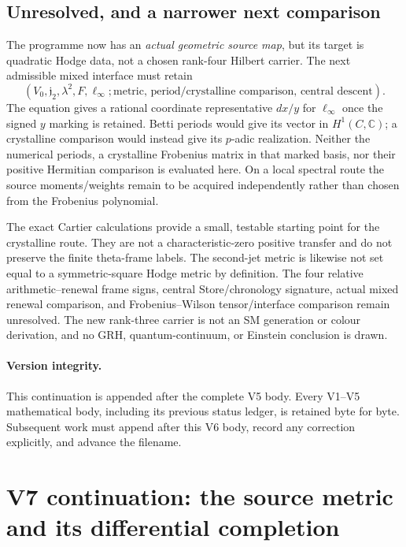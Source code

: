 \documentclass[11pt]{article}
\theoremstyle{definition}
\theoremstyle{remark}
\newcommand{\C}{\mathbb C}
\begin{document}
\subsection{Unresolved, and a narrower next comparison}
The programme now has an \emph{actual geometric source map}, but its
target is quadratic Hodge data, not a chosen rank-four Hilbert carrier.
The next admissible mixed interface must retain
\[
 \boxed{(V_0,\mathfrak j_2,\lambda^2,F,\ell_\infty;
          \text{metric, period/crystalline comparison, central descent}).}
\]
The equation gives a rational coordinate representative $dx/y$ for
$\ell_\infty$ once the signed $y$ marking is retained. Betti periods
would give its vector in $H^1(C,\C)$; a crystalline comparison would
instead give its $p$-adic realization. Neither the numerical periods,
a crystalline Frobenius matrix in that marked basis, nor their positive
Hermitian comparison is evaluated here. On a local spectral route the
source moments/weights remain to be acquired independently rather than
chosen from the Frobenius polynomial.

The exact Cartier calculations provide a small, testable starting point
for the crystalline route. They are not a characteristic-zero positive
transfer and do not preserve the finite theta-frame labels. The second-jet
metric is likewise not set equal to a symmetric-square Hodge metric by
definition. The four relative arithmetic--renewal frame signs, central
Store/chronology signature, actual mixed renewal comparison, and
Frobenius--Wilson tensor/interface comparison remain unresolved.
The new rank-three carrier is not an SM generation or colour derivation,
and no GRH, quantum-continuum, or Einstein conclusion is drawn.

\paragraph{Version integrity.}
This continuation is appended after the complete V5 body. Every V1--V5
mathematical body, including its previous status ledger, is retained byte
for byte. Subsequent work must append after this V6 body, record any
correction explicitly, and advance the filename.
\clearpage
\section{V7 continuation: the source metric and its differential completion}
\label{sec:v7-context}
\end{document}

